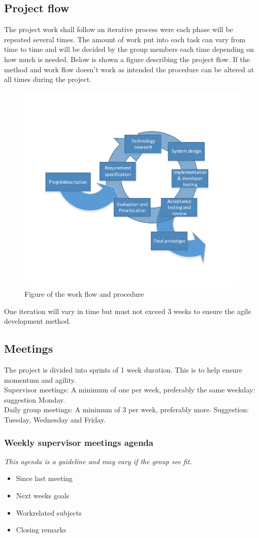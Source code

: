 \subsection{Project flow}
The project work shall follow an iterative process were each phase will be repeated several times. The amount of work put into each task can vary from time to time and will be decided by the group members each time depending on how much is needed. Below is shown a figure describing the project flow. If the method and work flow doesn't work as intended the procedure can be altered at all times during the project.
\begin{figure}[H]
\centering
\includegraphics[width=.8\textwidth]{billeder/iteration_vector}
\caption{Figure of the work flow and procedure}
\end{figure}
One iteration will vary in time but must not exceed 3 weeks to ensure the agile development method.\\

\subsection{Meetings}
The project is divided into sprints of 1 week duration. This is to help ensure momentum and agility.\\
Supervisor meetings: A minimum of one per week, preferably the same weekday: suggestion Monday.\\
Daily group meetings: A minimum of 3 per week, preferably more. Suggestion: Tuesday, Wednesday and Friday.

\subsubsection{Weekly supervisor meetings agenda}
\textit{This agenda is a guideline and may vary if the group see fit.}
\begin{itemize}
\item Since last meeting
\item Next weeks goals
\item Workrelated subjects
\item Closing remarks
\end{itemize}

